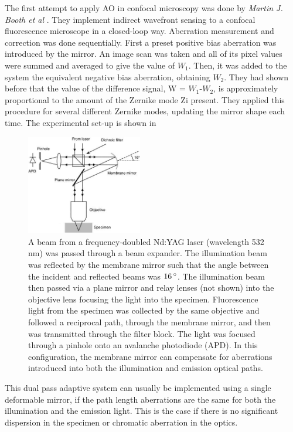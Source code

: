 The first attempt to apply AO in confocal microscopy was done by \textit{Martin J. Booth et al} \cite{AOM_scan_CFM}. They implement indirect wavefront sensing to a confocal fluorescence microscope in a closed-loop way. Aberration measurement and correction was done sequentially. First a preset positive bias aberration was introduced by the mirror. An image scan was taken and all of its pixel values were summed and averaged to give the value of $W_1$. Then, it was added to the system the equivalent negative bias aberration, obtaining $W_2$. They had shown before that the value of the difference signal, W = $W_1$-$W_2$, is approximately proportional to the amount of the Zernike mode Zi present. They applied this procedure for several different Zernike modes, updating the mirror shape each time. The experimental set-up is shown in 

\begin{figure}[htbp]
	\centering
		\includegraphics[width=0.45\textwidth]{images/AOM_scan_CFM.jpg}
		\caption{A beam from a frequency-doubled Nd:YAG laser (wavelength 532 nm) was passed through a beam expander. The illumination beam was reflected by the membrane mirror such that the angle between the incident and reflected beams was $\unit[16]{^{\circ}}$. The illumination beam then passed via a plane mirror and relay lenses (not shown) into the objective lens focusing the light into the specimen. Fluorescence light from the specimen was collected by the same objective and followed a reciprocal path, through the membrane mirror, and then was transmitted through the filter block. The light was focused through a pinhole onto an avalanche photodiode (APD). In this configuration, the membrane mirror can compensate for aberrations introduced into both the illumination and emission optical paths.}
	\label{fig:AOM_scan_CFM}
\end{figure}

This dual pass adaptive 
system can usually be implemented using a single deformable mirror, if the 
path length aberrations are the same for both the illumination and the 
emission light. This is the case if there is no significant dispersion in the 
specimen or chromatic aberration in the optics.

